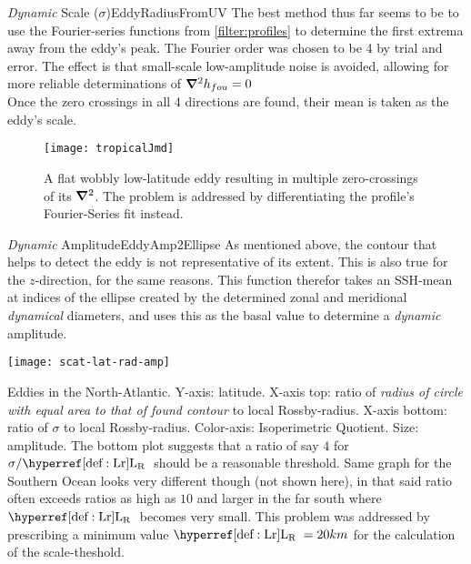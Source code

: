 \begin{filter}{\textit{Dynamic} Scale ($\sigma$)}{EddyRadiusFromUV}
The best method thus far seems to be to use the Fourier-series functions from \ref{filter:profiles} to determine the first extrema away from the eddy's peak. The Fourier order was chosen to be 4 by trial and error. The effect is that small-scale low-amplitude noise is avoided, allowing for more reliable determinations of $\mathbf{\bm{\nabla}}^2 h_{fou} = 0$       \\
 Once the zero crossings in all 4 directions are found, their mean is taken as the eddy's scale.
 \end{filter}\newline
\begin{figure}
	\texttt{[image: tropicalJmd]}
	\caption{A flat wobbly low-latitude eddy resulting in multiple zero-crossings of its $\mathbf{\bm{\nabla}}^2$. The problem is addressed by differentiating the profile's Fourier-Series fit instead.}
	\label{fig:tropicalJmd}
\end{figure}
\begin{filter}{\textit{Dynamic} Amplitude}{EddyAmp2Ellipse}
\label{filter:ampDyn}
As mentioned above, the contour that helps to detect the eddy is not
representative of its extent. This is also true for the $z$-direction, for the
same reasons. This function therefor takes an SSH-mean at indices of the ellipse
created by the determined zonal and meridional \textit{dynamical} diameters,
and uses this as the basal value to determine a \textit{dynamic} amplitude.
\end{filter}\newline
\begin{marginfigure}
	\texttt{[image: scat-lat-rad-amp]}
	\caption{Eddies in the North-Atlantic. Y-axis: latitude. X-axis top: ratio of \textit{radius of circle with equal area to that of found contour} to local Rossby-radius.  X-axis bottom: ratio of $\sigma$ to local Rossby-radius. Color-axis: Isoperimetric Quotient. Size: amplitude. The bottom plot suggests that a ratio of say $4$ for $\sigma/\Lr$ should be a reasonable threshold. Same graph for the Southern Ocean looks very different though (not shown here), in that said ratio often exceeds ratios as high as $10$ and larger in the far south where $\Lr$ becomes very small. This problem was addressed by prescribing a minimum value $\Lr=20km$ for the calculation of the scale-theshold.   }
	\label{fig:scat-lat-rad-amp}
\end{marginfigure}
